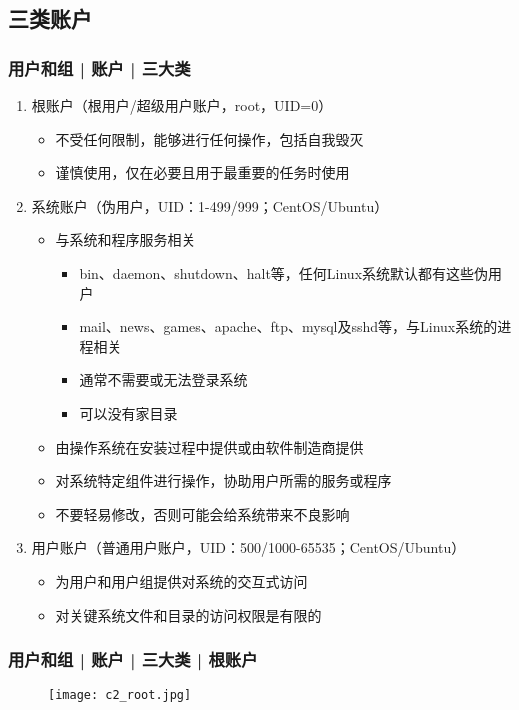\subsection{三类账户}
\begin{frame}
  \frametitle{用户和组 | 账户 | \alert{三大类}}
  \begin{enumerate}
    \item<1-> 根账户（根用户/超级用户账户，root，UID=0）
      \begin{itemize}
        \item<4-> 不受任何限制，能够进行任何操作，包括自我毁灭
        \item<5-> 谨慎使用，仅在必要且用于最重要的任务时使用
      \end{itemize}
    \item<2-> 系统账户（伪用户，UID：1-499/999；CentOS/Ubuntu）
      \begin{itemize}
        \item<6-> 与系统和程序服务相关
	  \begin{itemize}
	    \item bin、daemon、shutdown、halt等，任何Linux系统默认都有这些伪用户
	    \item mail、news、games、apache、ftp、mysql及sshd等，与Linux系统的进程相关
            \item 通常不需要或无法登录系统
            \item 可以没有家目录
	  \end{itemize}
        \item<6-> 由操作系统在安装过程中提供或由软件制造商提供
        \item<6-> 对系统特定组件进行操作，协助用户所需的服务或程序
        \item<7-> 不要轻易修改，否则可能会给系统带来不良影响
      \end{itemize}
    \item<3-> 用户账户（普通用户账户，UID：500/1000-65535；CentOS/Ubuntu）
      \begin{itemize}
        \item<8-> 为用户和用户组提供对系统的交互式访问
        \item<8-> 对关键系统文件和目录的访问权限是有限的
      \end{itemize}
  \end{enumerate}
\end{frame}

\begin{frame}
  \frametitle{用户和组 | 账户 | 三大类 | 根账户}
  \begin{figure}
    \centering
    \texttt{[image: c2\_root.jpg]}
  \end{figure}
\end{frame}

